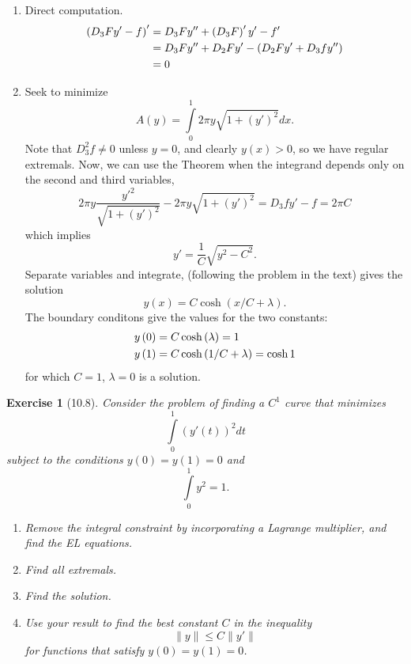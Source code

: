 \documentclass[letterpaper,twoside,11pt]{article}
\theoremstyle{mystyle}
\newtheorem*{exercise}{Exercise}
\newcommand{\cbk}{\color{black}}
\begin{document}
\begin{enumerate}
  \item Direct computation. 
  \begin{align*}
      \left( {{D_3}Fy' - f} \right)' &= {D_3}Fy'' + \left( {{D_3}F} \right)'y' - f' \hfill \\
       &= {D_3}Fy'' + {D_2}Fy' - \left( {{D_2}Fy' + {D_3}fy''} \right) \hfill \\
       &= 0 
  \end{align*}
  \item Seek to minimize 
  \[A\left( y \right) = \int\limits_0^1 {2\pi y\sqrt {1 + {{\left( {y'} \right)}^2}} dx} .\]
  Note that $D_3^2f \neq 0$ unless $y = 0$, and clearly $y(x) > 0$, so we have regular extremals. Now, we can use the Theorem when the integrand depends only on the second and third variables, 
  \[2\pi y\frac{{{{y'}^2}}}{{\sqrt {1 + {{\left( {y'} \right)}^2}} }} - 2\pi y\sqrt {1 + {{\left( {y'} \right)}^2}}  = {D_3}fy' - f = 2\pi C\]
  which implies 
  \[y' = \frac{1}{C}\sqrt{y^2 - C^2}.\]
  Separate variables and integrate, (following the problem in the text) gives the solution 
  \[y\left( x \right) = C\cosh \left( {x/C + \lambda } \right).\]
  The boundary conditons give the values for the two constants: 
  \[\begin{gathered}
    y\left( 0 \right) = C\cosh \left( \lambda  \right) = 1 \hfill \\
    y\left( 1 \right) = C\cosh \left( {1/C + \lambda } \right) = \cosh 1 
  \end{gathered} \]
  for which $C = 1$, $\lambda = 0$ is a solution. 
\end{enumerate}

\cbk 



\begin{exercise}[10.8]
  Consider the problem of finding a $C^1$ curve that minimizes 
  \[\int\limits_0^1 (y'(t))^2 dt\]
  subject to the conditions $y(0) = y(1) = 0$ and 
  \[\int\limits_0^1 y^2 = 1.\]
  \begin{enumerate}
    \item Remove the integral constraint by incorporating a Lagrange multiplier, and find the EL equations. 
    \item Find all extremals. 
    \item Find the solution. 
    \item Use your result to find the best constant $C$ in the inequality 
    \[\|y\|\leq C \|y'\|\]
    for functions that satisfy $y(0) = y(1) = 0$. 
  \end{enumerate}
\end{exercise}
\end{document}
